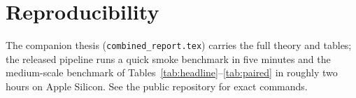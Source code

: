 \documentclass[11pt]{article}
\begin{document}
\section*{Reproducibility}
\noindent The companion thesis (\texttt{combined\_report.tex}) carries the full theory and tables; the released pipeline runs a quick smoke benchmark in five minutes and the medium-scale benchmark of Tables~\ref{tab:headline}--\ref{tab:paired} in roughly two hours on Apple Silicon.  See the public repository for exact commands.


\end{document}
